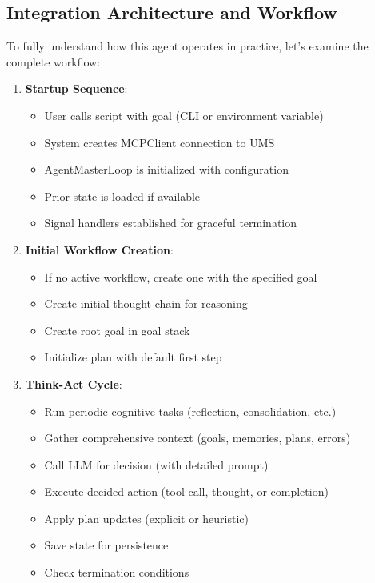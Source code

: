 \documentclass[12pt,a4paper]{article}
\begin{document}
\subsection*{Integration Architecture and Workflow}

To fully understand how this agent operates in practice, let's examine the complete workflow:

\begin{enumerate}[label=\arabic*.]
    \item \textbf{Startup Sequence}:
    \begin{itemize}
        \item User calls script with goal (CLI or environment variable)
        \item System creates MCPClient connection to UMS
        \item AgentMasterLoop is initialized with configuration
        \item Prior state is loaded if available
        \item Signal handlers established for graceful termination
    \end{itemize}
    \item \textbf{Initial Workflow Creation}:
    \begin{itemize}
        \item If no active workflow, create one with the specified goal
        \item Create initial thought chain for reasoning
        \item Create root goal in goal stack
        \item Initialize plan with default first step
    \end{itemize}
    \item \textbf{Think-Act Cycle}:
    \begin{itemize}
        \item Run periodic cognitive tasks (reflection, consolidation, etc.)
        \item Gather comprehensive context (goals, memories, plans, errors)
        \item Call LLM for decision (with detailed prompt)
        \item Execute decided action (tool call, thought, or completion)
        \item Apply plan updates (explicit or heuristic)
        \item Save state for persistence
        \item Check termination conditions

\end{itemize}
\end{enumerate}
\end{document}
